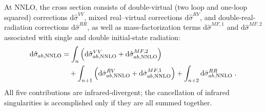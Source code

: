 \documentclass{SciPost}
\DeclareRobustCommand{\ensuremathrm}[1]{\ensuremath{\mathrm{#1}}}
\DeclareRobustCommand{\rd}{\ensuremathrm{d}}
\begin{document}
At NNLO, the cross section consists of double-virtual (two loop and one-loop squared) corrections $\rd\hat{\sigma}^{VV}$, mixed real--virtual
corrections $\rd\hat{\sigma}^{RV}$, and double-real-radiation corrections $\rd\hat{\sigma}^{RR}$, as well as mass-factorization terms $\rd\hat{\sigma}^{MF,1}$
and $\rd\hat{\sigma}^{MF,2}$ associated with single and double initial-state radiation:
\begin{align}
\label{eq:NNLOcs}
  \rd\hat{\sigma}_{ab,{\rm NNLO}}
  &=
  \int_{n}\left(\rd\hat{\sigma}^{VV}_{ab,{\rm NNLO}}+\rd\hat{\sigma}^{MF,2}_{ab,{\rm NNLO}}\right)
  \nonumber \\ &\quad +
  \int_{n+1}\left(\rd\hat{\sigma}^{RV}_{ab,{\rm NNLO}}+\rd\hat{\sigma}^{MF,1}_{ab,{\rm NNLO}}\right) +
  \int_{n+2}\rd\hat{\sigma}^{RR}_{ab,{\rm NNLO}}
  \;.
\end{align}
All five contributions are infrared-divergent; the cancellation of infrared singularities is accomplished only if they are all summed together.
\end{document}
